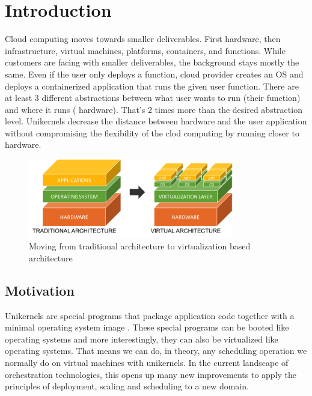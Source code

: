 
\chapter{Introduction}\label{chapter:introduction}
Cloud computing moves towards smaller deliverables. First hardware, then infrastructure, virtual machines, platforms, containers, and functions. While customers are facing with smaller deliverables, the background stays mostly the same. Even if the user only deploys a function, cloud provider creates an OS and deploys a containerized application that runs the given user function. There are at least 3 different abstractions between what user wants to run (their function) and where it runs ( hardware). That's 2 times more than the desired abstraction level. Unikernels decrease the distance between hardware and the user application without compromising the flexibility of the clod computing by running closer to hardware.

\begin{figure}[htpb]
  \centering
  \includegraphics[width=0.8\textwidth]{figures/1-123.png}
  \caption{Moving from traditional architecture to virtualization based architecture\cite{arch-photo} } \label{fig:arch}
\end{figure}
\section{Motivation}
Unikernels are special programs that package application code together with a minimal operating system image \cite{7396164}. These special programs can be booted like operating systems and more interestingly, they can also be virtualized like operating systems. That means we can do, in theory, any scheduling operation we normally do on virtual machines with unikernels. In the current landscape of orchestration technologies, this opens up many new improvements to apply the principles of deployment, scaling and scheduling to a new domain.

